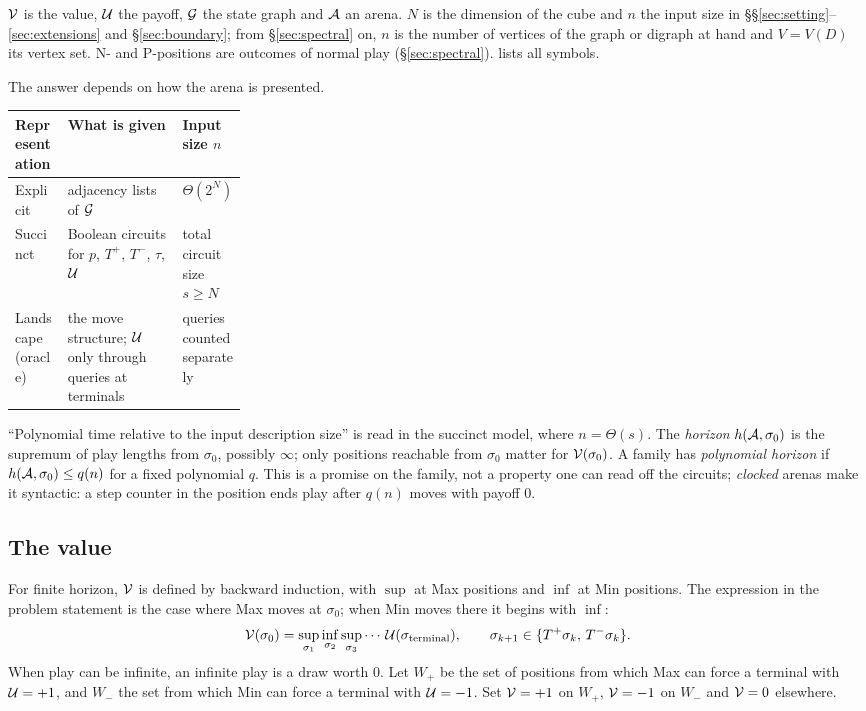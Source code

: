 \begin{remark*}[conventions]
$\mathcal{V}$ is the value, $\mathcal{U}$ the payoff, $\mathcal{G}$ the state graph and $\mathcal{A}$ an arena. $N$ is the dimension of the cube and $n$ the input size in \S\S\ref{sec:setting}--\ref{sec:extensions} and \S\ref{sec:boundary}; from \S\ref{sec:spectral} on, $n$ is the number of vertices of the graph or digraph at hand and $V=V(D)$ its vertex set. N- and P-positions are outcomes of normal play (\S\ref{sec:spectral}).  lists all symbols.
\end{remark*}

The answer depends on how the arena is presented.

\begin{center}\small
\begin{tabularx}{\linewidth}{@{}l>{\raggedright\arraybackslash}X>{\raggedright\arraybackslash}p{0.27\linewidth}@{}}
\toprule
Representation & What is given & Input size $n$\\ \midrule
Explicit & adjacency lists of $\mathcal{G}$ & $\Theta(2^N)$\\
Succinct & Boolean circuits for $p$, $T^{+}$, $T^{-}$, $\tau$, $\mathcal{U}$ & total circuit size $s\ge N$\\
Landscape (oracle) & the move structure; $\mathcal{U}$ only through queries at terminals & queries counted separately\\
\bottomrule
\end{tabularx}
\end{center}

``Polynomial time relative to the input description size'' is read in the succinct model, where $n=\Theta(s)$. The \emph{horizon} $h(\mathcal{A},\sigma_0)$ is the supremum of play lengths from $\sigma_0$, possibly $\infty$; only positions reachable from $\sigma_0$ matter for $\mathcal{V}(\sigma_0)$. A family has \emph{polynomial horizon} if $h(\mathcal{A},\sigma_0)\le q(n)$ for a fixed polynomial $q$. This is a promise on the family, not a property one can read off the circuits; \emph{clocked} arenas make it syntactic: a step counter in the position ends play after $q(n)$ moves with payoff $0$.

\subsection{The value}
For finite horizon, $\mathcal{V}$ is defined by backward induction, with $\sup$ at Max positions and $\inf$ at Min positions. The expression in the problem statement is the case where Max moves at $\sigma_0$; when Min moves there it begins with $\inf$:
\[
\mathcal{V}(\sigma_0)=\sup_{\sigma_1}\inf_{\sigma_2}\sup_{\sigma_3}\cdots\,\mathcal{U}(\sigma_{\mathrm{terminal}}),\qquad \sigma_{k+1}\in\{T^{+}\sigma_k,\,T^{-}\sigma_k\}.
\]
When play can be infinite, an infinite play is a draw worth $0$. Let $W_{+}$ be the set of positions from which Max can force a terminal with $\mathcal{U}=+1$, and $W_{-}$ the set from which Min can force a terminal with $\mathcal{U}=-1$. Set $\mathcal{V}=+1$ on $W_{+}$, $\mathcal{V}=-1$ on $W_{-}$ and $\mathcal{V}=0$ elsewhere.

